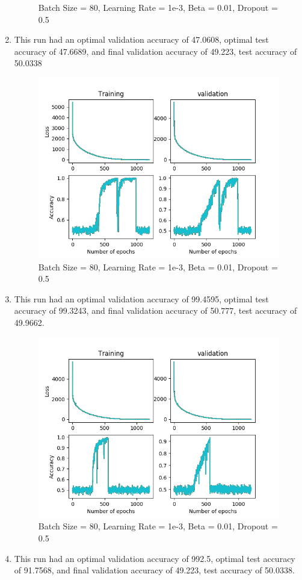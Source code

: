 \documentclass[12pt,reqno]{amsart}
\numberwithin{equation}{section}
\begin{document}
\begin{enumerate}
\begin{figure}[H]
\caption{Batch Size = 80, Learning Rate = 1e-3, Beta = 0.01, Dropout = 0.5}
\end{figure}
\item This run had an optimal validation accuracy of 47.0608, optimal test accuracy of 47.6689, and final validation accuracy of 49.223, test accuracy of 50.0338 

\begin{figure}[H]
\centering
\includegraphics[scale=0.6]{learning-rate-rep2-1e-3-80-1e-2-5e-1}
\caption{Batch Size = 80, Learning Rate = 1e-3, Beta = 0.01, Dropout = 0.5}
\end{figure}
\item This run had an optimal validation accuracy of 99.4595, optimal test accuracy of 99.3243, and final validation accuracy of 50.777, test accuracy of 49.9662. 

\begin{figure}[H]
\centering
\includegraphics[scale=0.6]{learning-rate-rep3-1e-3-80-1e-2-5e-1}
\caption{Batch Size = 80, Learning Rate = 1e-3, Beta = 0.01, Dropout = 0.5}
\end{figure}
\item This run had an optimal validation accuracy of 992.5, optimal test accuracy of 91.7568, and final validation accuracy of 49.223, test accuracy of 50.0338. 


\end{enumerate}
\end{document}

